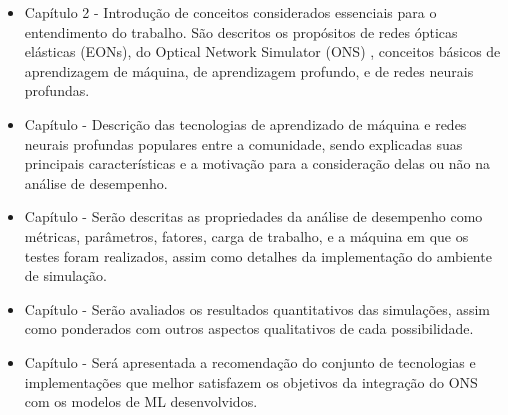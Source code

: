 \begin{itemize}
  \item Capítulo 2 - Introdução de conceitos considerados essenciais para o entendimento do trabalho. São descritos os propósitos de redes ópticas elásticas (EONs), do Optical Network Simulator (ONS) \cite{costa2016ons}, conceitos básicos de aprendizagem de máquina, de aprendizagem profundo, e de redes neurais profundas.

  \item Capítulo \todo[?] - Descrição das tecnologias de aprendizado de máquina e redes neurais profundas populares entre a comunidade, sendo explicadas suas principais características e a motivação para a consideração delas ou não na análise de desempenho.

  \item Capítulo \todo[análise] - Serão descritas as propriedades da análise de desempenho como métricas, parâmetros, fatores, carga de trabalho, e a máquina em que os testes foram realizados, assim como detalhes da implementação do ambiente de simulação.

  \item Capítulo \todo[resultados] - Serão avaliados os resultados quantitativos das simulações, assim como ponderados com outros aspectos qualitativos de cada possibilidade.

  \item Capítulo \todo[conclusão] - Será apresentada a recomendação do conjunto de tecnologias e implementações que melhor satisfazem os objetivos da integração do ONS com os modelos de ML desenvolvidos.
\end{itemize}







